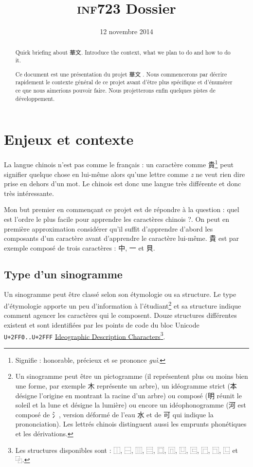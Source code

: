 \documentclass[12pt,oneside]{article}
\title{\textsc{inf723} Dossier}
\date{12 novembre 2014}
\begin{document}
\maketitle
\begin{abstract}\foreignlanguage{english}{Quick briefing about 華文. Introduce the context, what we plan to do and how to do it.}

Ce document est une présentation du projet \og 華文 \fg{}. Nous commencerons par décrire rapidement le contexte général de ce projet avant d'être plus spécifique et d'énumérer ce que nous aimerions pouvoir faire. Nous projetterons enfin quelques pistes de développement.\end{abstract}
\tableofcontents

\section{Enjeux et contexte}

La langue chinois n'est pas comme le français : un caractère comme 貴\footnote{Signifie : honorable, précieux et se prononce \textsl{guì}.} peut signifier quelque chose en lui-même alors qu'une lettre comme \textsl{z} ne veut rien dire prise en dehors d'un mot. Le chinois est donc une langue très différente et donc très intéressante.

Mon but premier en commençant ce projet est de répondre à la question : \og quel est l'ordre le plus facile pour apprendre les caractères chinois ?\fg{}. On peut en première approximation considérer qu'il suffit d'apprendre d'abord les composants d'un caractère avant d'apprendre le caractère lui-même. 貴 est par exemple composé de trois caractères : 中, 一 et 貝.

\subsection{Type d'un sinogramme}

Un sinogramme peut être classé selon son étymologie ou sa structure. Le type d'étymologie apporte un peu d'information à l'étudiant\footnote{Un sinogramme peut être un pictogramme (il représentent plus ou moins bien une forme, par exemple 木 représente un arbre), un idéogramme strict (本 désigne l'origine en montrant la racine d'un arbre) ou composé (明 réunit le soleil et la lune et désigne la lumière) ou encore un idéophonogramme (河 est composé de 氵, version déformé de l'eau 水 et de 可 qui indique la prononciation). Les lettrés chinois distinguent aussi les emprunts phonétiques et les dérivations.} et sa structure indique comment agencer les caractères qui le composent. Douze structures différentes existent et sont identifiées par les points de code du bloc Unicode \texttt{U+2FF0..U+2FFF} \href{https://en.wikipedia.org/wiki/Ideographic\_Description\_Characters\_\%28Unicode\_block\%29}{Ideographic Description Characters}\footnote{Les structures disponibles sont : ⿰, ⿱, ⿲, ⿳, ⿴, ⿵, ⿶, ⿷, ⿸, ⿹, ⿺ et ⿻.}.
\end{document}
